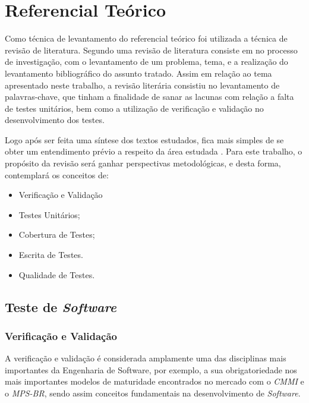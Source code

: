 \chapter{Referencial Teórico}

	Como técnica de levantamento do referencial teórico foi utilizada a técnica de revisão de literatura. Segundo  uma revisão de literatura consiste em no processo de investigação, com o levantamento de um problema, tema, e a realização do levantamento bibliográfico  do assunto tratado. Assim em relação ao tema apresentado neste trabalho, a revisão literária consistiu no levantamento de palavras-chave, que tinham a finalidade de  sanar as lacunas com relação a falta de testes unitários, bem como a utilização de verificação e validação no desenvolvimento dos testes.

    Logo após ser feita uma síntese dos textos estudados, fica mais simples de se obter um entendimento prévio a respeito da área estudada  .
    Para este trabalho, o propósito da revisão será ganhar perspectivas metodológicas, e desta forma, contemplará os conceitos de:

    \begin{itemize}

        \item Verificação e Validação
        \item Testes Unitários;
        \item Cobertura de Testes;
        \item Escrita de Testes.
        \item Qualidade de Testes.
    \end{itemize}

\vfill
\pagebreak

\section{Teste de \textit{Software}}

\subsection{Verificação e Validação}

A verificação e validação é considerada amplamente uma das disciplinas mais importantes da Engenharia de Software, por exemplo, a sua obrigatoriedade nos mais importantes modelos de maturidade encontrados no mercado com o \textit{CMMI} e o \textit{MPS-BR}, sendo assim conceitos fundamentais na desenvolvimento de \textit{Software}.

